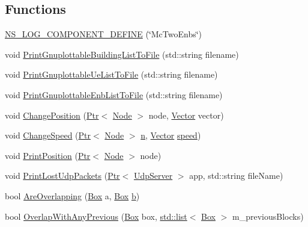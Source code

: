 \subsection*{Functions}
\begin{DoxyCompactItemize}
\item 
\hyperlink{mc-twoenbs_8cc_a5c66643c1990ab414561bd2b71e42882}{N\+S\+\_\+\+L\+O\+G\+\_\+\+C\+O\+M\+P\+O\+N\+E\+N\+T\+\_\+\+D\+E\+F\+I\+NE} (\char`\"{}Mc\+Two\+Enbs\char`\"{})
\item 
void \hyperlink{mc-twoenbs_8cc_aa3ac76c624e240e8ea6e415ff2289b4b}{Print\+Gnuplottable\+Building\+List\+To\+File} (std\+::string filename)
\item 
void \hyperlink{mc-twoenbs_8cc_ad818a3dd4c090b8ecaba926e5272c409}{Print\+Gnuplottable\+Ue\+List\+To\+File} (std\+::string filename)
\item 
void \hyperlink{mc-twoenbs_8cc_a7e3aa5272ba032faa7717e0f3ba2f73d}{Print\+Gnuplottable\+Enb\+List\+To\+File} (std\+::string filename)
\item 
void \hyperlink{mc-twoenbs_8cc_a7795a50a26be021a3b8e47ebe455387c}{Change\+Position} (\hyperlink{classns3_1_1Ptr}{Ptr}$<$ \hyperlink{classns3_1_1Node}{Node} $>$ node, \hyperlink{classns3_1_1Vector3D_a7e59b47bc94c9cb1dadff68c1d0112d8}{Vector} vector)
\item 
void \hyperlink{mc-twoenbs_8cc_a1fe18c61b129ac2c333ca0c841e280ee}{Change\+Speed} (\hyperlink{classns3_1_1Ptr}{Ptr}$<$ \hyperlink{classns3_1_1Node}{Node} $>$ \hyperlink{lte__link__budget__x2__handover__measures_8m_abdb05bc5a064cf642a06c83b3392f148}{n}, \hyperlink{classns3_1_1Vector3D_a7e59b47bc94c9cb1dadff68c1d0112d8}{Vector} \hyperlink{mmwave-amc-test_8cc_a6dc6e6f3c75c509ce943163afb5dade7}{speed})
\item 
void \hyperlink{mc-twoenbs_8cc_afdc3b76bdd4b7f860b42f06c87c0d8ec}{Print\+Position} (\hyperlink{classns3_1_1Ptr}{Ptr}$<$ \hyperlink{classns3_1_1Node}{Node} $>$ node)
\item 
void \hyperlink{mc-twoenbs_8cc_a48c6af75b3508021f7b5d5847dd4a888}{Print\+Lost\+Udp\+Packets} (\hyperlink{classns3_1_1Ptr}{Ptr}$<$ \hyperlink{classns3_1_1UdpServer}{Udp\+Server} $>$ app, std\+::string file\+Name)
\item 
bool \hyperlink{mc-twoenbs_8cc_a1afb216dd9cb3e096360a211c59259dd}{Are\+Overlapping} (\hyperlink{classns3_1_1Box}{Box} a, \hyperlink{classns3_1_1Box}{Box} \hyperlink{lte__pathloss_8m_a21ad0bd836b90d08f4cf640b4c298e7c}{b})
\item 
bool \hyperlink{mc-twoenbs_8cc_a08eb26a4a36d9f76efe4b37c2815cb11}{Overlap\+With\+Any\+Previous} (\hyperlink{classns3_1_1Box}{Box} box, \hyperlink{openflow-interface_8h_afd9bcfa176617760671b67580f536fa7}{std\+::list}$<$ \hyperlink{classns3_1_1Box}{Box} $>$ m\+\_\+previous\+Blocks)

\end{DoxyCompactItemize}
